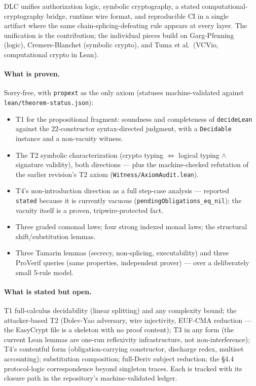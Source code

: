 
DLC unifies authorization logic, symbolic cryptography, a stated
computational-cryptography bridge, runtime wire format, and
reproducible CI in a single artifact where the same
chain-splicing-defeating rule appears at every layer.  The
unification is the contribution; the individual pieces build on
Garg-Pfenning (logic), Cremers-Blanchet (symbolic crypto), and Tuma
et al.~(VCVio, computational crypto in Lean).

\paragraph{What is proven.}  Sorry-free, with \texttt{propext} as the
only axiom (statuses machine-validated against
\texttt{lean/theorem-status.json}):
\begin{itemize}
\item T1 for the propositional fragment: soundness and completeness
  of \texttt{decideLean} against the 22-constructor syntax-directed
  judgment, with a \texttt{Decidable} instance and a non-vacuity
  witness.
\item The T2 symbolic characterization (crypto typing $\iff$ logical
  typing $\wedge$ signature validity), both directions --- plus the
  machine-checked refutation of the earlier revision's T2 axiom
  (\texttt{Witness/AxiomAudit.lean}).
\item T4's non-introduction direction as a full step-case analysis
  --- reported \texttt{stated} because it is currently vacuous
  (\texttt{pendingObligations\_eq\_nil}); the vacuity itself is a
  proven, tripwire-protected fact.
\item Three graded comonad laws; four strong indexed monad laws;
  the structural shift/substitution lemmas.
\item Three Tamarin lemmas (secrecy, non-splicing, executability) and
  three ProVerif queries (same properties, independent prover) ---
  over a deliberately small 5-rule model.
\end{itemize}

\paragraph{What is stated but open.}  T1 full-calculus decidability
(linear splitting) and any complexity bound; the attacker-based T2
(Dolev-Yao adversary, wire injectivity, EUF-CMA reduction --- the
EasyCrypt file is a skeleton with no proof content); T3 in any form
(the current Lean lemmas are one-run reflexivity infrastructure, not
non-interference); T4's contentful form (obligation-carrying
constructor, discharge redex, multiset accounting); substitution
composition; full-\textsf{Deriv} subject reduction; the \S 4.4
protocol-logic correspondence beyond singleton traces.  Each is
tracked with its closure path in the repository's machine-validated
ledger.

